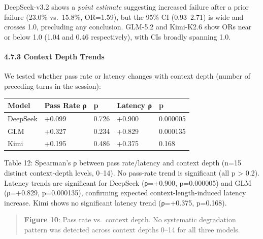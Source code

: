 DeepSeek-v3.2 shows a \emph{point estimate} suggesting increased failure after a prior failure (23.0\% vs.~15.8\%, OR=1.59), but the 95\% CI (0.93--2.71) is wide and crosses 1.0, precluding any conclusion. GLM-5.2 and Kimi-K2.6 show ORs near or below 1.0 (1.04 and 0.46 respectively), with CIs broadly spanning 1.0.



\paragraph{4.7.3 Context Depth Trends}\label{context-depth-trends}



We tested whether pass rate or latency changes with context depth (number of preceding turns in the session):



{\def\LTcaptype{none} %

\begin{longtable}[]{@{}lllll@{}}

\toprule\noalign{}

Model & Pass Rate ρ & p & Latency ρ & p \\

\midrule\noalign{}

\endhead

\bottomrule\noalign{}

\endlastfoot

DeepSeek & +0.099 & 0.726 & +0.900 & 0.000005 \\

GLM & +0.327 & 0.234 & +0.829 & 0.000135 \\

Kimi & +0.195 & 0.486 & +0.375 & 0.168 \\

\end{longtable}

}



Table 12: Spearman's ρ between pass rate/latency and context depth (n=15 distinct context-depth levels, 0--14). No pass-rate trend is significant (all p \textgreater{} 0.2). Latency trends are significant for DeepSeek (ρ=+0.900, p=0.000005) and GLM (ρ=+0.829, p=0.000135), confirming expected context-length-induced latency increase. Kimi shows no significant latency trend (ρ=+0.375, p=0.168).



\begin{quote}

\textbf{Figure 10}: Pass rate vs.~context depth. No systematic degradation pattern was detected across context depths 0--14 for all three models.

\end{quote}



